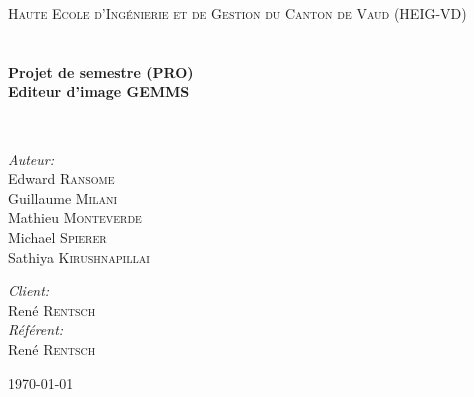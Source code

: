 \begin{titlepage}
    \begin{center}
        
        \textsc{\LARGE Haute Ecole d'Ingénierie et de Gestion du Canton de Vaud (HEIG-VD)}\\[1.5cm]
        
        \textsc{\Large }\\[0.5cm]
        
        \HRule \\[0.4cm]
        
        {\huge \bfseries Projet de semestre (PRO)\\
        Editeur d'image GEMMS \\[0.4cm] }
        
        \HRule \\[1.5cm]
        
        \begin{minipage}{0.4\textwidth}
            \begin{flushleft} \large
                \emph{Auteur:}\\
                Edward \textsc{Ransome}\\
                Guillaume \textsc{Milani}\\
                Mathieu \textsc{Monteverde}\\
                Michael \textsc{Spierer}\\
                Sathiya \textsc{Kirushnapillai}
            \end{flushleft}
        \end{minipage}
        \begin{minipage}{0.4\textwidth}
            \begin{flushright} \large
                \emph{Client:} \\
                René \textsc{Rentsch}\\
                \emph{Référent:} \\
                René \textsc{Rentsch}\\
            \end{flushright}
        \end{minipage}
        
        \vfill
        
        {\large \today}
    
    \end{center}
\end{titlepage}
